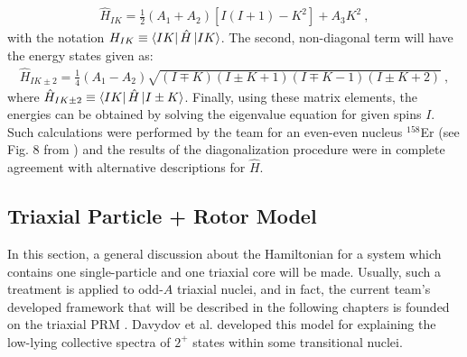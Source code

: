 \begin{align}
    \hat{H}_{IK}=\frac{1}{2}(A_1+A_2)\left[I(I+1)-K^2\right]+A_3K^2\ ,
\end{align}
with the notation $H_{IK}\equiv\bra{IK}\hat{H}\ket{IK}$. The second, non-diagonal term will have the energy states given as:
\begin{align}
    \hat{H}_{IK\pm2}=\frac{1}{4}(A_1-A_2)\sqrt{(I\mp K)(I\pm K +1)(I \mp K -1)(I\pm K +2)}\ ,
\end{align}
where $\hat{H}_{IK\pm 2}\equiv \bra{IK}\hat{H}\ket{I\pm K}$. Finally, using these matrix elements, the energies can be obtained by solving the eigenvalue equation for given spins $I$. Such calculations were performed by the team for an even-even nucleus $^{158}$Er (see Fig. 8 from  \cite{raduta2017semiclassical}) and the results of the diagonalization procedure were in complete agreement with alternative descriptions for $\hat{H}$.

\subsection{Triaxial Particle + Rotor Model}

In this section, a general discussion about the Hamiltonian for a system which contains one single-particle and one triaxial core will be made. Usually, such a treatment is applied to odd-$A$ triaxial nuclei, and in fact, the current team's developed framework that will be described in the following chapters is founded on the triaxial PRM \cite{davydov1958rotational}. Davydov et al. developed this model for explaining the low-lying collective spectra of $2^+$ states within some transitional nuclei.

